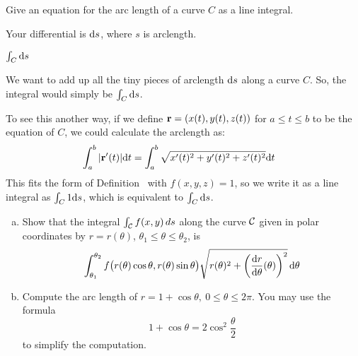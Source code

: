 

\subsection*{\Conceptual}
\begin{question}
Give an equation for the arc length of a curve $C$ as a line integral.
\end{question}
\begin{hint}
Your differential is $\mathrm{d}s$, where $s$ is arclength.
\end{hint}
\begin{answer}
$\int_C \mathrm{d}s$
\end{answer}
\begin{solution}
We want to add up all the tiny pieces of arclength $\mathrm{d}s$ along a curve $C$. So, the integral would simply be $\int_C \mathrm{d}s$.

To see this another way, if we define $\mathbf{r}=(x(t),y(t),z(t))$ for $a \le t \le b$ to be the equation of $C$, we could calculate the arclength as:
\begin{align*}
\int_a^b |\mathbf{r}'(t)|\mathrm{d}t&=\int_a^b \sqrt{x'(t)^2+y'(t)^2+z'(t)^2}\mathrm{d}t
\end{align*}
This fits the form of Definition~ with $f(x,y,z)=1$, so we write it as a line integral as $\int_C 1 \mathrm{d}s$, which is equivalent to $\int_C \mathrm{d}s$.
\end{solution}


\begin{question}
\begin{enumerate}[(a)]
\item
Show that the integral $\int_{\mathcal{C}} f(x,y)\,ds$ 
along the curve $\mathcal{C}$ given in polar coordinates by 
$r=r(\theta)$, $\theta_1\le \theta\le\theta_2$, is
\begin{equation*}
\int_{\theta_1}^{\theta_2}f\big(r(\theta)\cos\theta, r(\theta)\sin\theta\big) \sqrt{r(\theta)^2+\left(\diff{r}{\theta}(\theta)\right)^2}\,
\dee{\theta}
\end{equation*}

\item
Compute the arc length of $r=1+\cos\theta,\ 0\le \theta\le 2\pi$.
You may use the formula
\begin{equation*}
1+\cos\theta=2\cos^2\frac{\theta}{2}
\end{equation*}
to simplify the computation.	
\end{enumerate}
\end{question}

